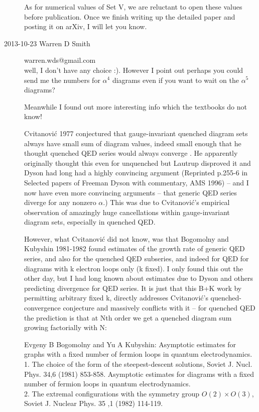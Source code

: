 \begin{description}
 As for numerical values of Set V, we are reluctant to open these values
 before publication.  Once we finish writing up the detailed paper and
 posting it on arXiv,  I will let you know.

\item[2013-10-23  Warren D Smith] warren.wds@gmail.com\\
well, I don't have any choice :).  However I point out perhaps you could send
me the numbers for $\alpha^4$ diagrams even if you want to wait on the
$\alpha^5$  diagrams?

Meanwhile I found out more interesting info which the textbooks do not know!

Cvitanovi\'c 1977 conjectured that gauge-invariant quenched diagram sets
always have small sum of diagram values, indeed small enough that he
thought quenched QED series
would always converge
    .
He apparently originally thought this even
for unquenched but Lautrup disproved it and Dyson had long had a
highly convincing argument (Reprinted p.255-6 in Selected papers
of Freeman Dyson with
commentary, AMS 1996)
-- and I now have even more convincing
arguments -- that generic QED series diverge for any nonzero $\alpha$.)
This was due to Cvitanovi\'c's empirical observation of amazingly huge
cancellations within gauge-invariant diagram sets, especially in
quenched QED.

However, what Cvitanovi\'c did not know, was that
{Bogomolny} and Kubyshin 1981-1982
found estimates of the growth rate of generic QED series, and also for the
quenched QED subseries,
and indeed for QED for diagrams with k electron loops only (k fixed).
I only found this out the other day, but I had long known about
estimates due to Dyson and others predicting divergence for QED
series.  It is just that this B+K work by permitting arbitrary fixed
k, directly addresses Cvitanovi\'c's quenched-convergence conjecture and
massively conflicts with it -- for quenched QED the prediction is that
at Nth order we get a quenched diagram sum growing factorially with N:

Evgeny B Bogomolny and Yu A Kubyshin:
Asymptotic estimates for graphs with a fixed number of fermion loops
in quantum electrodynamics.
\\
1. The choice of the form of the
steepest-descent solutions,
Soviet J. Nucl. Phys. 34,6 (1981) 853-858.
Asymptotic estimates for diagrams with a fixed number of fermion loops
in quantum electrodynamics.
\\
2. The extremal configurations with the
symmetry group $O(2)\times O(3)$,
Soviet J. Nuclear Phys. 35 ,1 (1982) 114-119.


\end{description}
